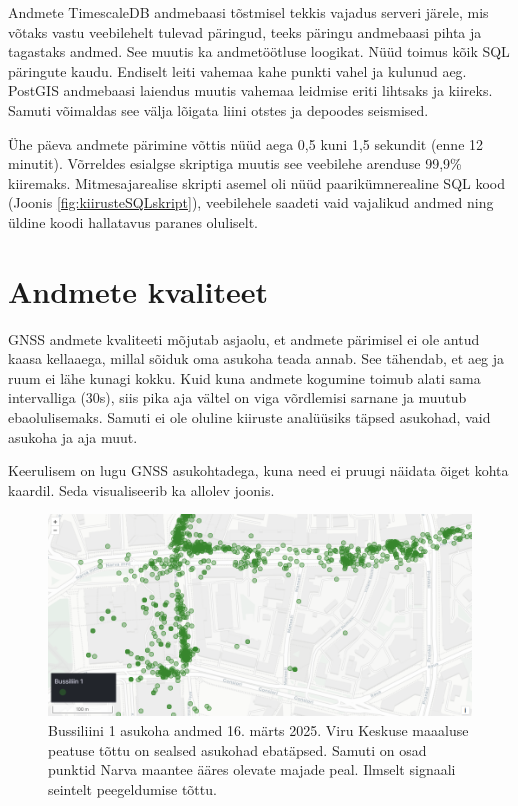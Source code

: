 Andmete TimescaleDB andmebaasi tõstmisel tekkis vajadus serveri järele, mis võtaks vastu veebilehelt tulevad päringud, teeks päringu andmebaasi pihta ja tagastaks andmed. See muutis ka andmetöötluse loogikat. Nüüd toimus kõik SQL päringute kaudu. Endiselt leiti vahemaa kahe punkti vahel ja kulunud aeg. PostGIS andmebaasi laiendus muutis vahemaa leidmise eriti lihtsaks ja kiireks. Samuti võimaldas see välja lõigata liini otstes ja depoodes seismised.

Ühe päeva andmete pärimine võttis nüüd aega 0,5 kuni 1,5 sekundit (enne 12 minutit). Võrreldes esialgse skriptiga muutis see veebilehe arenduse 99,9\% kiiremaks. Mitmesajarealise skripti asemel oli nüüd paarikümnerealine SQL kood (Joonis \ref{fig:kiirusteSQLskript}), veebilehele saadeti vaid vajalikud andmed ning üldine koodi hallatavus paranes oluliselt.

\section{Andmete kvaliteet}

GNSS andmete kvaliteeti mõjutab asjaolu, et andmete pärimisel ei ole antud kaasa kellaaega, millal sõiduk oma asukoha teada annab. See tähendab, et aeg ja ruum ei lähe kunagi kokku. Kuid kuna andmete kogumine toimub alati sama intervalliga (30s), siis pika aja vältel on viga võrdlemisi sarnane ja muutub ebaolulisemaks. Samuti ei ole oluline kiiruste analüüsiks täpsed asukohad, vaid asukoha ja aja muut. 

Keerulisem on lugu GNSS asukohtadega, kuna need ei pruugi näidata õiget kohta kaardil. Seda visualiseerib ka allolev joonis.

\begin{figure}[H] %
    \centering
    \includegraphics[width=.8\textwidth]{figures/gpsvead.png} %
    \caption{Bussiliini 1 asukoha andmed 16. märts 2025. Viru Keskuse maaaluse peatuse tõttu on sealsed asukohad ebatäpsed. Samuti on osad punktid Narva maantee ääres olevate majade peal. Ilmselt signaali seintelt peegeldumise tõttu.} %
    \label{fig:gpsnoise} %
\end{figure}

